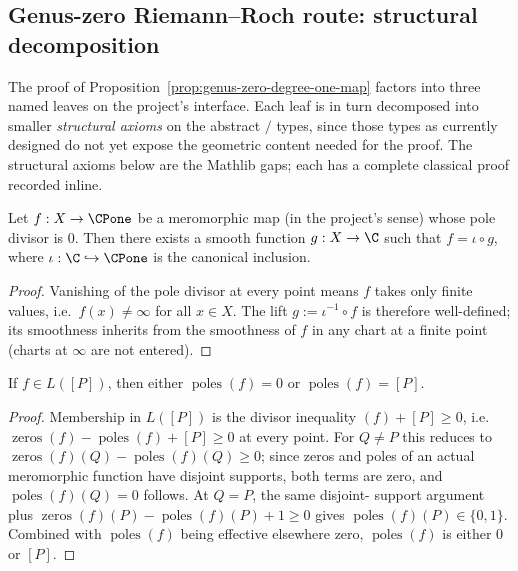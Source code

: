 \subsection{Genus-zero Riemann--Roch route: structural decomposition}
\label{sec:genus-zero-rr-route}

The proof of Proposition~\ref{prop:genus-zero-degree-one-map}
factors into three named leaves on the project's
 interface. Each leaf is in turn
decomposed into smaller \emph{structural axioms} on the abstract
 \(\!{}/{}\!\) types, since
those types as currently designed do not yet expose the geometric
content needed for the proof. The structural axioms below are the
Mathlib gaps; each has a complete classical proof recorded
inline.

\begin{lemma}
\label{lem:meromorphic-no-poles-factors}
Let \(f:X\to\CPone\) be a meromorphic map (in the project's sense)
whose pole divisor is \(0\). Then there exists a smooth function
\(g:X\to\C\) such that \(f=\iota\circ g\), where
\(\iota:\C\hookrightarrow\CPone\) is the canonical inclusion.
\leanok
\end{lemma}
\begin{proof}
\leanok
Vanishing of the pole divisor at every point means \(f\) takes only
finite values, i.e.\ \(f(x)\neq\infty\) for all \(x\in X\). The lift
\(g:=\iota^{-1}\circ f\) is therefore well-defined; its smoothness
inherits from the smoothness of \(f\) in any chart at a finite point
(charts at \(\infty\) are not entered).
\end{proof}

\begin{lemma}
\label{lem:mem-L-point-pole-bound}
If \(f\in L([P])\), then either \(\operatorname{poles}(f)=0\) or
\(\operatorname{poles}(f)=[P]\).
\leanok
\end{lemma}
\begin{proof}
\leanok
Membership in \(L([P])\) is the divisor inequality
\((f)+[P]\geq 0\), i.e.\ \(\operatorname{zeros}(f)-\operatorname{poles}(f)+[P]\geq 0\) at every
point. For \(Q\neq P\) this reduces to
\(\operatorname{zeros}(f)(Q)-\operatorname{poles}(f)(Q)\geq 0\); since zeros and poles of an
actual meromorphic function have disjoint supports, both terms are
zero, and \(\operatorname{poles}(f)(Q)=0\) follows. At \(Q=P\), the same disjoint-
support argument plus \(\operatorname{zeros}(f)(P)-\operatorname{poles}(f)(P)+1\geq 0\) gives
\(\operatorname{poles}(f)(P)\in\{0,1\}\). Combined with \(\operatorname{poles}(f)\) being
effective elsewhere zero, \(\operatorname{poles}(f)\) is either \(0\) or \([P]\).
\end{proof}

